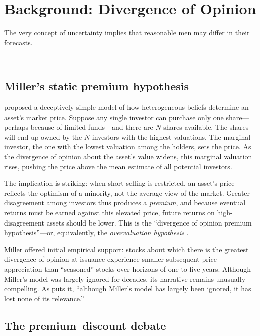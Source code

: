 \section{Background: Divergence of Opinion}
\label{sec:background}

\epigraph{The very concept of uncertainty implies that reasonable men may
differ in their forecasts.}{---\citet{miller1977}}

\subsection{Miller's static premium hypothesis}
\label{sec:bg-miller}

\citet{miller1977} proposed a deceptively simple model of how heterogeneous
beliefs determine an asset's market price. Suppose any single investor can
purchase only one share---perhaps because of limited funds---and there are
$N$ shares available. The shares will end up owned by the $N$ investors with
the highest valuations. The marginal investor, the one with the lowest
valuation among the holders, sets the price. As the divergence of opinion
about the asset's value widens, this marginal valuation rises, pushing the
price above the mean estimate of all potential investors.

The implication is striking: when short selling is restricted, an asset's
price reflects the optimism of a minority, not the average view of the market.
Greater disagreement among investors thus produces a \emph{premium}, and
because eventual returns must be earned against this elevated price, future
returns on high-disagreement assets should be lower. This is the
``divergence of opinion premium hypothesis''---or, equivalently, the
\emph{overvaluation hypothesis} \citep{doukas2006}.

Miller offered initial empirical support: stocks about which there is the
greatest divergence of opinion at issuance experience smaller subsequent price
appreciation than ``seasoned'' stocks over horizons of one to five years.
Although Miller's model was largely ignored for decades, its narrative remains
unusually compelling. As \citet{moffitt2017} puts it, ``although Miller's
model has largely been ignored, it has lost none of its relevance.''

\subsection{The premium--discount debate}
\label{sec:bg-debate}

